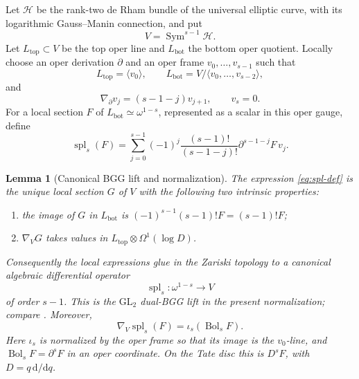 \documentclass[11pt]{article}
\newtheorem{lemma}[lemma]{Lemma}
\theoremstyle{definition}
\theoremstyle{remark}
\newcommand{\Sym}{\operatorname{Sym}}
\newcommand{\calH}{\mathcal H}
\begin{document}
Let $\calH$ be the rank-two de Rham bundle of the universal elliptic curve,
with its logarithmic Gauss--Manin connection, and put
\[
 V=\Sym^{s-1}\calH.
\]
Let $L_{\mathrm{top}}\subset V$ be the top oper line and
$L_{\mathrm{bot}}$ the bottom oper quotient.  Locally choose an oper
derivation $\partial$ and an oper frame $v_0,\ldots,v_{s-1}$ such that
\[
 L_{\mathrm{top}}=\langle v_0\rangle,
 \qquad
 L_{\mathrm{bot}}=V/\langle v_0,\ldots,v_{s-2}\rangle,
\]
and
\[
 \nabla_\partial v_j=(s-1-j)v_{j+1},
 \qquad v_s=0.
\]
For a local section $F$ of $L_{\mathrm{bot}}\simeq\omega^{1-s}$,
represented as a scalar in this oper gauge, define
\begin{equation}\label{eq:spl-def}
 \operatorname{spl}_s(F)=
 \sum_{j=0}^{s-1}
 (-1)^j\frac{(s-1)!}{(s-1-j)!}
 \partial^{s-1-j}F\,v_j.
\end{equation}

\begin{lemma}[Canonical BGG lift and normalization]\label{lem:BGG}
The expression \eqref{eq:spl-def} is the unique local section $G$ of $V$
with the following two intrinsic properties:
\begin{enumerate}[label=\textup{(\roman*)}]
\item the image of $G$ in $L_{\mathrm{bot}}$ is
$(-1)^{s-1}(s-1)!F=(s-1)!F$;
\item $\nabla_VG$ takes values in
$L_{\mathrm{top}}\otimes\Omega^1(\log D)$.
\end{enumerate}
Consequently the local expressions glue in the Zariski topology to a
canonical algebraic differential operator
\[
 \operatorname{spl}_s:\omega^{1-s}\longrightarrow V
\]
of order $s-1$.  This is the $\mathrm{GL}_2$ dual-BGG lift in the present
normalization; compare \cite[Proposition~2.4.3]{RodriguezCamargo2023}.  Moreover,
\begin{equation}\label{eq:BGG}
 \nabla_V\operatorname{spl}_s(F)
 =\iota_s(\operatorname{Bol}_sF).
\end{equation}
Here $\iota_s$ is normalized by the oper frame so that its image is the
$v_0$-line, and $\operatorname{Bol}_sF=\partial^sF$ in an oper coordinate.
On the Tate disc this is $D^sF$, with $D=q\,\mathrm d/\mathrm dq$.
\end{lemma}
\end{document}
